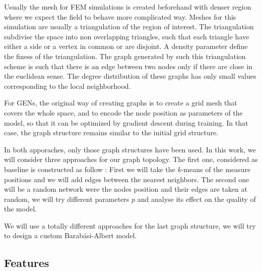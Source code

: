 \documentclass[a4paper,10pt]{article}
\newcommand{\ap}[1]{\marginpar{{\tiny \color{purple} [AP] #1}}}
\begin{document}
Usually the mesh for FEM simulations is created beforehand with denser region where we expect the field to behave more complicated way. Meshes for this simulation are usually a triangulation of the region of interest. The triangulation subdivise the space into non overlapping triangles, such that each triangle have either a side or a vertex in common or are disjoint. A density parameter define the finess of the triangulation. The graph generated by such this triangulation scheme is such that there is an edge between two nodes only if there are close in the euclidean sense. The degree distribution of these graphs has only small values corresponding to the local neighborhood.

\ap{TODO : graph}

For GENs, the original way of creating graphs is to create a grid mesh that covers the whole space, and to encode the node position as parameters of the model, so that it can be optimized by gradient descent during training. In that case, the graph structure remains similar to the initial grid structure.

\ap{TODO : graph}

In both apporaches, only those graph structures have been used. In this work, we will consider three approaches for our graph topology. The first one, considered as baseline is constructed as follow : First we will take the $k$-means of the measure positions and we will add edges between the nearest neighbors. The second one will be a random network were the nodes position and their edges are taken at random, we will try different parameters $p$ and analyse its effect on the quality of the model.

We will use a totally different approaches for the last graph structure, we will try to design a custom Barab\'asi-Albert model.
\ap{TODO : graph}


\subsection{Features}




\end{document}
